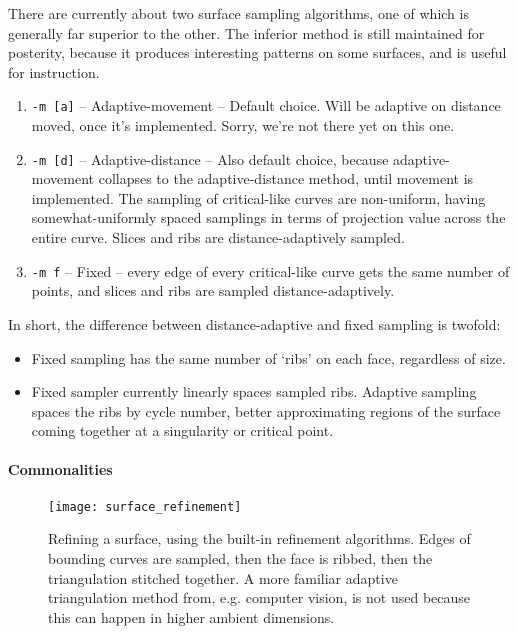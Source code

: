 There are currently about two surface sampling algorithms, one of which is generally far superior to the other.  The inferior method is still maintained for posterity, because it produces interesting patterns on some surfaces, and is useful for instruction. 

\begin{enumerate}
\item {\tt -m [a]} – Adaptive-movement – Default choice.  Will be adaptive on distance moved, once it's implemented.  Sorry, we're not there yet on this one.
\item {\tt -m [d]} – Adaptive-distance – Also default choice, because adaptive-movement collapses to the adaptive-distance method, until movement is implemented.  The sampling of critical-like curves are non-uniform, having somewhat-uniformly spaced samplings in terms of projection value across the entire curve.  Slices and ribs are distance-adaptively sampled.
\item {\tt -m f} – Fixed – every edge of every critical-like curve gets the same number of points, and slices and ribs are sampled distance-adaptively.
\end{enumerate}

In short, the difference between distance-adaptive and fixed sampling is twofold:
\begin{itemize}

  \item Fixed sampling has the same number of `ribs' on each face, regardless of size.

  \item Fixed sampler currently linearly spaces sampled ribs.  Adaptive sampling spaces the ribs by cycle number, better approximating regions of the surface coming together at a singularity or critical point.  

\end{itemize}


\paragraph*{Commonalities}

\begin{figure}[H]
\begin{center}
\texttt{[image: surface\_refinement]}
\caption[Surface refinement]{Refining a surface, using the built-in refinement algorithms.  Edges of bounding curves are sampled, then the face is ribbed, then the triangulation stitched together.  A more familiar adaptive triangulation method from, e.g. computer vision, is not used because this can happen in higher ambient dimensions.}
\end{center}
\end{figure}

